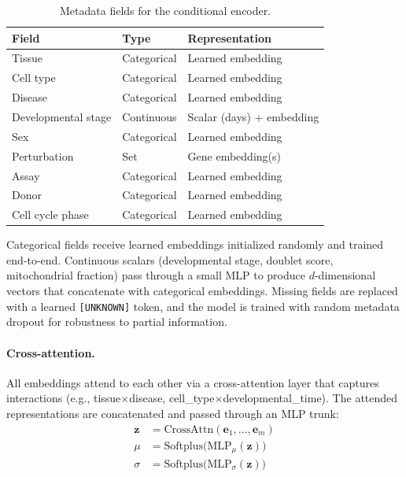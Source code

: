 \documentclass[10pt,twocolumn,letterpaper]{article}
\begin{document}
\begin{table}[t]
  \centering
  \caption{Metadata fields for the conditional encoder.}
  \label{tab:metadata}
  \small
  \begin{tabular}{@{}lll@{}}
    \toprule
    Field & Type & Representation \\
    \midrule
    Tissue & Categorical & Learned embedding \\
    Cell type & Categorical & Learned embedding \\
    Disease & Categorical & Learned embedding \\
    Developmental stage & Continuous & Scalar (days) + embedding \\
    Sex & Categorical & Learned embedding \\
    Perturbation & Set & Gene embedding(s) \\
    Assay & Categorical & Learned embedding \\
    Donor & Categorical & Learned embedding \\
    Cell cycle phase & Categorical & Learned embedding \\
    \bottomrule
  \end{tabular}
\end{table}

Categorical fields receive learned embeddings initialized randomly and trained
end-to-end. Continuous scalars (developmental stage, doublet score, mitochondrial
fraction) pass through a small MLP to produce $d$-dimensional vectors that
concatenate with categorical embeddings. Missing fields are replaced with a
learned \texttt{[UNKNOWN]} token, and the model is trained with random metadata
dropout for robustness to partial information.

\paragraph{Cross-attention.}
All embeddings attend to each other via a cross-attention layer that captures
interactions (e.g., tissue$\times$disease, cell\_type$\times$developmental\_time).
The attended representations are concatenated and passed through an MLP trunk:
\begin{align}
  \mathbf{z} &= \text{CrossAttn}(\mathbf{e}_1, \ldots, \mathbf{e}_m) \\
  \mu &= \text{Softplus}\bigl(\text{MLP}_\mu(\mathbf{z})\bigr) \\
  \sigma &= \text{Softplus}\bigl(\text{MLP}_\sigma(\mathbf{z})\bigr)
\end{align}
\end{document}
